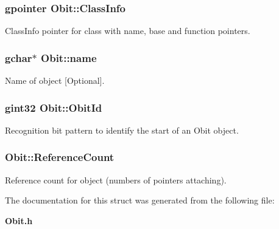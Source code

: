 \subsubsection{\setlength{\rightskip}{0pt plus 5cm}gpointer {\bf Obit::Class\-Info}}\label{structObit_o1}


Class\-Info pointer for class with name, base and function pointers. 

\subsubsection{\setlength{\rightskip}{0pt plus 5cm}gchar$\ast$ {\bf Obit::name}}\label{structObit_o3}


Name of object [Optional]. 

\subsubsection{\setlength{\rightskip}{0pt plus 5cm}gint32 {\bf Obit::Obit\-Id}}\label{structObit_o0}


Recognition bit pattern to identify the start of an Obit object. 

\subsubsection{ {\bf Obit::Reference\-Count}}\label{structObit_o2}


Reference count for object (numbers of pointers attaching). 



The documentation for this struct was generated from the following file:\begin{CompactItemize}
\item 
{\bf Obit.h}\end{CompactItemize}

